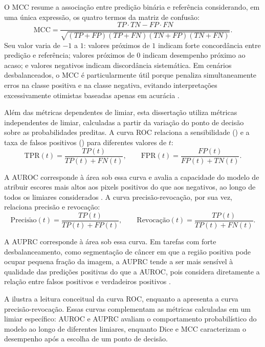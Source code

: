 O MCC resume a associação entre predição binária e referência considerando, em
uma única expressão, os quatro termos da matriz de confusão:
\begin{equation}\label{eq:mcc}
    \mathrm{MCC} =
    \frac{TP \cdot TN - FP \cdot FN}
    {\sqrt{(TP+FP)(TP+FN)(TN+FP)(TN+FN)}}.
\end{equation}
Seu valor varia de $-1$ a $1$: valores próximos de $1$ indicam forte concordância
entre predição e referência; valores próximos de $0$ indicam desempenho próximo
ao acaso; e valores negativos indicam discordância sistemática. Em cenários
desbalanceados, o MCC é particularmente útil porque penaliza simultaneamente
erros na classe positiva e na classe negativa, evitando interpretações
excessivamente otimistas baseadas apenas em acurácia \cite{chicco2020advantages}.

Além das métricas dependentes de limiar, esta dissertação utiliza métricas
independentes de limiar, calculadas a partir da variação do ponto de decisão
sobre as probabilidades preditas. A curva ROC relaciona a sensibilidade
() e a taxa de falsos positivos
() para diferentes valores de $t$:
\begin{equation}\label{eq:tpr-fpr}
    \mathrm{TPR}(t)=\frac{TP(t)}{TP(t)+FN(t)},
    \qquad
    \mathrm{FPR}(t)=\frac{FP(t)}{FP(t)+TN(t)}.
\end{equation}

A AUROC corresponde à área sob essa curva e avalia a capacidade do modelo de
atribuir escores mais altos aos pixels positivos do que aos negativos, ao longo
de todos os limiares considerados \cite{fawcett2006roc}.
A curva precisão-revocação, por sua vez, relaciona precisão e revocação:
\begin{equation}\label{eq:precision-recall}
    \mathrm{Precis\tilde{a}o}(t)=\frac{TP(t)}{TP(t)+FP(t)},
    \qquad
    \text{Revoca\c{c}\~ao}(t)=\frac{TP(t)}{TP(t)+FN(t)}.
\end{equation}

A AUPRC corresponde à área sob essa curva. Em tarefas com forte
desbalanceamento, como segmentação de câncer em que a região positiva pode
ocupar pequena fração da imagem, a AUPRC tende a ser mais sensível à qualidade
das predições positivas do que a AUROC, pois considera diretamente a relação
entre falsos positivos e verdadeiros positivos \cite{saito2015precision}.

A  ilustra a leitura conceitual da curva ROC,
enquanto a  apresenta a curva precisão-revocação.
Essas curvas complementam as métricas calculadas em um limiar específico: AUROC
e AUPRC avaliam o comportamento probabilístico do modelo ao longo de diferentes
limiares, enquanto Dice e MCC caracterizam o desempenho após a escolha de um
ponto de decisão.

